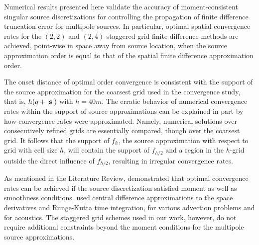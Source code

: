 Numerical results presented here validate the accuracy of moment-consistent singular source discretizations for controlling the propagation of finite difference truncation error for multipole sources.  
In particular, optimal spatial convergence rates for the $(2,2)$ and $(2,4)$ staggered grid finite difference methods are achieved, point-wise in space away from source location, when the source approximation order is equal to that of the spatial finite difference approximation order.

The onset distance of optimal order convergence is consistent with the support of the source approximation for the coarsest grid used in the convergence study, that is, $h(q+|{\bf s}|)$ with $h=40m$.
The erratic behavior of numerical convergence rates within the support of source approximations can be explained in part by how convergence rates were approximated.
Namely, numerical solutions over consecutively refined grids are essentially compared, though over the coarsest grid.
It follows that the support of $f_{h}$, the source approximation with respect to grid with cell size $h$, will contain the support of $f_{h/2}$ and a region in the $h$-grid outside the direct influence of $f_{h/2}$, resulting in irregular convergence rates.

As mentioned in the Literature Review, \cite{Petersson:2016}
demonstrated that optimal convergence rates can be achieved if the
source discretization satisfied moment as well as smoothness
conditions. \cite{Petersson:2016} used central difference
approximations to the space derivatives and Runge-Kutta time
integration, for various advection problems and for acoustics. The
staggered grid schemes used in our work, however, do not require
additional constraints beyond the moment conditions for the multipole
source approximations.





